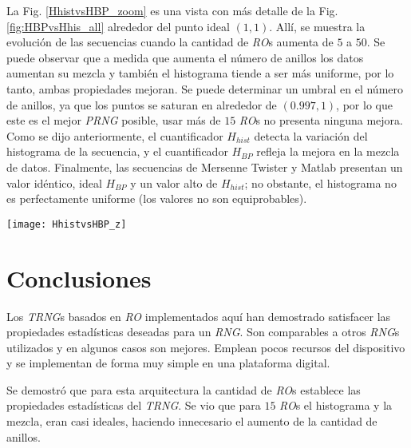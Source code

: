 La Fig. \ref{HhistvsHBP_zoom} es una vista con más detalle de la Fig. \ref{fig:HBPvsHhis_all} alrededor del punto ideal $(1,1)$.
Allí, se muestra la evolución de las secuencias cuando la cantidad de \emph{RO}s aumenta de $5$ a $50$.
Se puede observar que a medida que aumenta el número de anillos los datos aumentan su mezcla y también el histograma tiende a ser más uniforme, por lo tanto, ambas propiedades mejoran.
Se puede determinar un umbral en el número de anillos, ya que los puntos se saturan en alrededor de $(0.997,1)$, por lo que este es el mejor \emph{PRNG} posible, usar más de $15$ \emph{RO}s no presenta ninguna mejora.
Como se dijo anteriormente, el cuantificador $H_ {hist}$ detecta la variación del histograma de la secuencia, y el cuantificador $ H_ {BP} $ refleja la mejora en la mezcla de datos.
Finalmente, las secuencias de Mersenne Twister y Matlab presentan un valor idéntico, ideal $H_ {BP}$ y un valor alto de $H_ {hist}$; no obstante, el histograma no es perfectamente uniforme (los valores no son equiprobables).
%
\begin{figure*}
	\begin{center}
		\texttt{[image: HhistvsHBP\_z]}
		\caption{Detalle de la Fig. \ref{fig:HBPvsHhis_all} alrededor del punto ideal $(1,1)$.}
		\label{HhistvsHBP_zoom}
	\end{center}
\end{figure*}

\section{Conclusiones}

Los \emph{TRNG}s basados en \emph{RO} implementados aquí han demostrado satisfacer las propiedades estadísticas deseadas para un \emph{RNG}.
Son comparables a otros \emph{RNG}s utilizados y en algunos casos son mejores.
Emplean pocos recursos del dispositivo y se implementan de forma muy simple en una plataforma digital.

Se demostró que para esta arquitectura la cantidad de \emph{RO}s establece las propiedades estadísticas del \emph{TRNG}.
Se vio que para $15$ \emph{RO}s el histograma y la mezcla, eran casi ideales, haciendo innecesario el aumento de la cantidad de anillos.